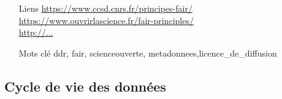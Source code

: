 \documentclass{book}
\begin{document}
\begin{itemize}
    \item [Liens]
        \url{https://www.ccsd.cnrs.fr/principes-fair/}\\
        \url{https://www.ouvrirlascience.fr/fair-principles/}\\
        \url{http://...}\\
    \item [Mots clé]
        \gls{ddr}, \gls{fair}, \gls{scienceouverte}, \gls{metadonnees},\gls{licence_de_diffusion}
\end{itemize}

\subsection{Cycle de vie des données}
\end{document}
